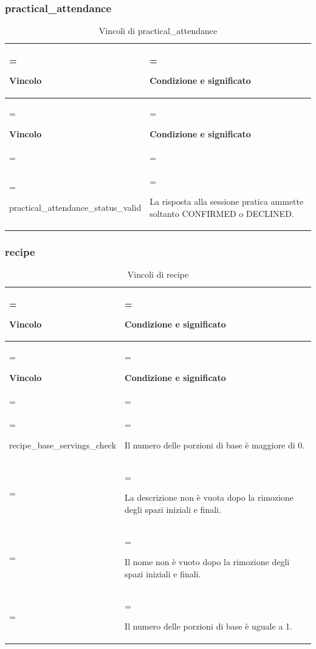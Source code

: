 \documentclass[11pt,a4paper]{article}
\begin{document}
\subsubsection{practical\_attendance}
{\small\renewcommand{\arraystretch}{1.25}
\begin{xltabular}{\linewidth}{>{\hsize\linewidth=\hsize\raggedright\arraybackslash}X>{\hsize\linewidth=\hsize\raggedright\arraybackslash}X}
\caption{Vincoli di practical\_attendance}\label{tab:dictionary-39}\\
\toprule
\textbf{Vincolo} & \textbf{Condizione e significato}\\\midrule\endfirsthead\toprule\textbf{Vincolo} & \textbf{Condizione e significato}\\\midrule\endhead
\midrule{}\\\endfoot\bottomrule\endlastfoot

{\ttfamily\small practical\_\allowbreak{}attendance\_\allowbreak{}status\_\allowbreak{}valid} & La risposta alla sessione pratica ammette soltanto CONFIRMED o DECLINED.\\*
\end{xltabular}}

\subsubsection{recipe}
{\small\renewcommand{\arraystretch}{1.25}
\begin{xltabular}{\linewidth}{>{\hsize\linewidth=\hsize\raggedright\arraybackslash}X>{\hsize\linewidth=\hsize\raggedright\arraybackslash}X}
\caption{Vincoli di recipe}\label{tab:dictionary-40}\\
\toprule
\textbf{Vincolo} & \textbf{Condizione e significato}\\\midrule\endfirsthead\toprule\textbf{Vincolo} & \textbf{Condizione e significato}\\\midrule\endhead
\midrule{}\\\endfoot\bottomrule\endlastfoot

{\ttfamily\small recipe\_\allowbreak{}base\_\allowbreak{}servings\_\allowbreak{}check} & Il numero delle porzioni di base è maggiore di 0.\\ & La descrizione non è vuota dopo la rimozione degli spazi iniziali e finali.\\ & Il nome non è vuoto dopo la rimozione degli spazi iniziali e finali.\\ & Il numero delle porzioni di base è uguale a 1.\\*
\end{xltabular}}
\end{document}
